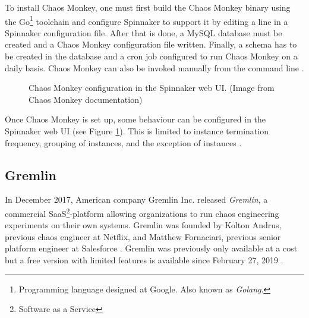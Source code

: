 \documentclass{article}
\begin{document}
To install Chaos Monkey, one must first build the Chaos Monkey binary using the Go\footnote{Programming language designed at Google. Also known as \textit{Golang}.} toolchain and configure Spinnaker to support it by editing a line in a Spinnaker configuration file. After that is done, a MySQL database must be created and a Chaos Monkey configuration file written. Finally, a schema has to be created in the database and a cron job configured to run Chaos Monkey on a daily basis. Chaos Monkey can also be invoked manually from the command line \cite{chaosMonkeyManual}.

\begin{figure}[h]
    \centering
    \caption{Chaos Monkey configuration in the Spinnaker web UI. (Image from Chaos Monkey documentation)}
    \label{fig:spinnakerconfig}
\end{figure}

Once Chaos Monkey is set up, some behaviour can be configured in the Spinnaker web UI (see Figure \ref{fig:spinnakerconfig}). This is limited to instance termination frequency, grouping of instances, and the exception of instances \cite{chaosMonkeyManual}.

\subsection{Gremlin}

In December 2017, American company Gremlin Inc. released \textit{Gremlin}, a commercial SaaS\footnote{Software as a Service}-platform allowing organizations to run chaos engineering experiments on their own systems. Gremlin was founded by Kolton Andrus, previous chaos engineer at Netflix, and Matthew Fornaciari, previous senior platform engineer at Salesforce \cite{gremlinAbout}. Gremlin was previously only available at a cost but a free version with limited features is available since February 27, 2019 \cite{gremlinFree}.
\end{document}
